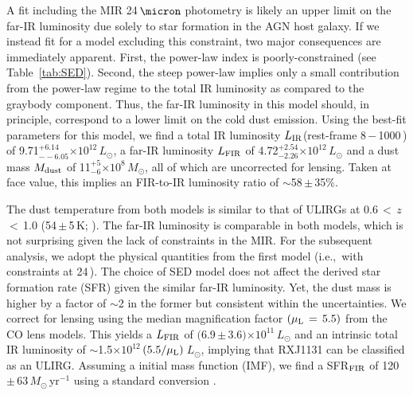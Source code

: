 \documentclass[]{emulateapj}
\newcommand{\Msun}{\mbox{$M_{\odot}$}\xspace}
\newcommand{\Lsun}{\mbox{$L_{\odot}$}\xspace}
\newcommand{\LIR}{\mbox{$L_{\rm IR}$}\xspace}
\newcommand{\LFIR}{\mbox{$L_{\rm FIR}$}\xspace}
\newcommand{\sfrU}{\mbox{\Msun\,yr$^{-1}$}\xspace}
\newcommand{\E}[1]{\mbox{$\times10^{#1}$}}
\newcommand{\petm}[2]{$^{+#1}_{-#2}$}
\newcommand{\eq}{\,=\,}
\newcommand{\pmm}{\,$\pm$\,}
\newcommand{\ie}{{i.e.,~}}
\newcommand{\Tab}[1]{Table~\ref{tab:#1}}
\newcommand{\SF}{star formation\xspace}
\newcommand{\fir}{far-IR\xspace}
\begin{document}
A fit including the MIR 24\,$\micron$ photometry
is likely an upper limit on the \fir luminosity due solely to \SF
in the AGN host galaxy.
If we instead fit for a model excluding this constraint,
two major consequences are immediately apparent.
First, the power-law index is poorly-constrained (see \Tab{SED}).
Second, the steep power-law implies only a small contribution
from the power-law regime
to the total IR luminosity as compared to the graybody component.
Thus, the \fir luminosity in
this model should, in principle, correspond to a
lower limit on the cold dust emission.
Using the best-fit parameters
for this model, we find a total IR luminosity
\LIR (rest-frame 8\,$-$\,1000\,\micron) of 9.71\petm{6.14}{-6.05}\E{12}\,\Lsun,
a \fir luminosity \LFIR of 4.72\petm{2.54}{2.26}\E{12}\,\Lsun and a
dust mass $M_{\rm dust}$ of 11\petm{5}{6}\E{8}\,\Msun, all of which are uncorrected for lensing.
Taken at face value, this implies an FIR-to-IR luminosity ratio
of $\sim$58\pmm35\%.

The dust temperature from both models is similar to that of
ULIRGs at 0.6\,$<$\,$z$\,$<$\,1.0 (54\,$\pm$\,5\,K;
\citealt[hereafter C13]{Combes13a}).
The \fir luminosity is comparable in both models, which is
not surprising given the lack of constraints in the MIR.
For the subsequent analysis, we adopt the physical quantities
from the first model (\ie with constraints at 24\,\micron).
The choice of SED model does not affect
the derived star formation rate (SFR) given the similar \fir luminosity.
Yet, the dust mass is higher by a factor of $\sim$2 in the former but consistent within the
uncertainties.
We correct for lensing using the median magnification
factor $(\mu_{\rm L}\eq5.5)$
from the CO lens models. This yields a
\LFIR of $($6.9\pmm3.6$)$\E{11}\,\Lsun
and
an intrinsic total IR luminosity of $\sim$1.5\E{12}\,$(5.5/\mu_{\rm L})$\,\Lsun, implying that RXJ1131 can be classified as an ULIRG.
Assuming a \citet{Salpeter55a} initial
mass function (IMF), we find a
SFR$_{\rm FIR}$ of 120\pmm63\,\sfrU using a
standard conversion \citep{Kennicutt98a}.
\end{document}
